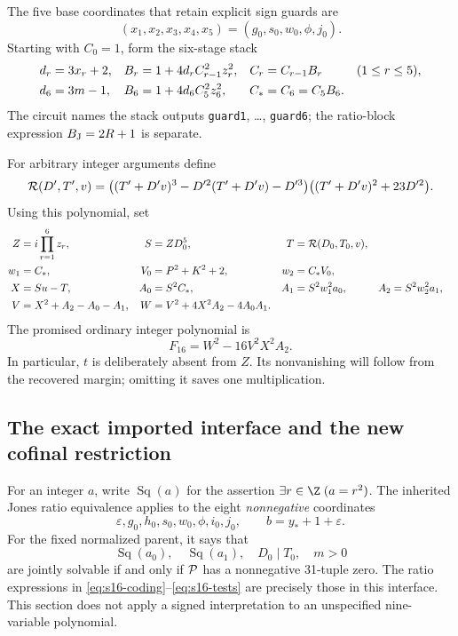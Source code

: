 The five base coordinates that retain explicit sign guards are
\[
 (x_1,x_2,x_3,x_4,x_5)=(g_0,s_0,w_0,\phi,j_0).
\]
Starting with \(C_0=1\), form the six-stage stack
\begin{align}
 d_r&=3x_r+2,&
 B_r&=1+4d_rC_{r-1}^2z_r^2,&
 C_r&=C_{r-1}B_r &&(1\leq r\leq5),\notag\\
 d_6&=3m-1,&
 B_6&=1+4d_6C_5^2z_6^2,&
 C_*&=C_6=C_5B_6 .
 \label{eq:s16-stack}
\end{align}
The circuit names the stack outputs \texttt{guard1}, \ldots,
\texttt{guard6}; the ratio-block expression \(B_{\rm J}=2R+1\)
is separate.

For arbitrary integer arguments define
\begin{equation}
 {\cal R}(D',T',v)=
 \big((T'+D'v)^3-D'^2(T'+D'v)-D'^3\big)
 \big((T'+D'v)^2+23D'^2\big).
 \label{eq:s16-homogeneous}
\end{equation}
Using this polynomial, set
\begin{align}
 Z&=i\prod_{r=1}^{6}z_r,&
 S&=ZD_0^5,& T&={\cal R}(D_0,T_0,v),\notag\\
 w_1&=C_*,&
 V_0&=P^2+K^2+2,&
 w_2&=C_*V_0,\notag\\
 X&=Su-T,&
 A_0&=S^2C_*,&
 A_1&=S^2w_1^2a_0,&
 A_2&=S^2w_2^2a_1,\notag\\
 V&=X^2+A_2-A_0-A_1,&
 W&=V^2+4X^2A_2-4A_0A_1 .
 \label{eq:s16-finalizer}
\end{align}
The promised ordinary integer polynomial is
\begin{equation}
 \boxed{\displaystyle F_{16}=W^2-16V^2X^2A_2.}
 \label{eq:s16-polynomial}
\end{equation}
In particular, \(t\) is deliberately absent from \(Z\).  Its nonvanishing
will follow from the recovered margin; omitting it saves one multiplication.

\subsection{The exact imported interface and the new cofinal restriction}

For an integer \(a\), write
\(\operatorname{Sq}(a)\) for the assertion
\(\exists r\in\Z\;(a=r^2)\).
The inherited Jones ratio equivalence applies to the eight
\emph{nonnegative} coordinates
\[
 \varepsilon,g_0,h_0,s_0,w_0,\phi,i_0,j_0,
 \qquad b=y_*+1+\varepsilon.
\]
For the fixed normalized parent, it says that
\begin{equation}
 \operatorname{Sq}(a_0),\quad \operatorname{Sq}(a_1),\quad
 D_0\mid T_0,\quad m>0
 \label{eq:s16-jr}
\end{equation}
are jointly solvable if and only if \({\cal P}\) has a nonnegative
31-tuple zero.  The ratio expressions in
\eqref{eq:s16-coding}--\eqref{eq:s16-tests} are precisely those in this
interface.  This section does not apply a signed interpretation to an
unspecified nine-variable polynomial.

